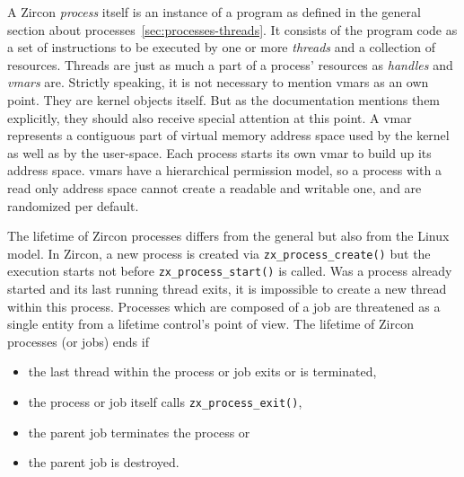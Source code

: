 A Zircon \textit{process} itself is an instance of a program as defined in the general section about processes~\ref{sec:processes-threads}.
It consists of the program code as a set of instructions to be executed by one or more \textit{threads} and a collection of resources.
Threads are just as much a part of a process' resources as \textit{handles} and \textit{\acp{vmar}} are\cite{zircon-process}.
Strictly speaking, it is not necessary to mention \acp{vmar} as an own point.
They are kernel objects itself.
But as the documentation mentions them explicitly, they should also receive special attention at this point.
A \ac{vmar} represents a contiguous part of virtual memory address space used by the kernel as well as by the user-space. 
Each process starts its own \ac{vmar} to build up its address space.
\acp{vmar} have a hierarchical permission model, so a process with a read only address space cannot create a readable and writable one, and are randomized per default\cite{zircon-vmar}.

The lifetime of Zircon processes differs from the general but also from the Linux model.
In Zircon, a new process is created via \texttt{zx\_process\_create()} but the execution starts not before \texttt{zx\_process\_start()} is called.
Was a process already started and its last running thread exits, it is impossible to create a new thread within this process.
Processes which are composed of a job are threatened as a single entity from a lifetime control's point of view.
The lifetime of Zircon processes (or jobs) ends if 
\begin{itemize}
    \item the last thread within the process or job exits or is terminated,
    \item the process or job itself calls \texttt{zx\_process\_exit()},
    \item the parent job terminates the process or
    \item the parent job is destroyed\cite{zircon-process}.
\end{itemize}

